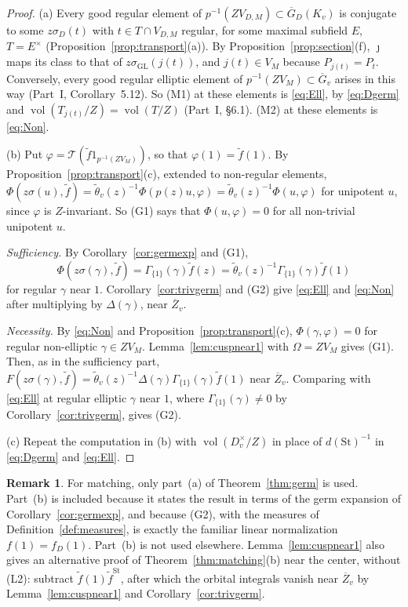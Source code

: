 \documentclass[12pt]{article}
\newcommand{\ov}[1]{\overline{#1}}
\newcommand{\vol}{\operatorname{vol}}
\newcommand{\GL}{\mathrm{GL}}
\newcommand{\St}{\mathrm{St}}
\newcommand{\Gb}{\ov{G}}
\newcommand{\Zb}{\ov{Z}}
\newcommand{\GDb}{\ov{G}_D}
\newcommand{\jj}{\jmath}
\newcommand{\sg}{\sigma}
\theoremstyle{plain}
\theoremstyle{definition}
\newtheorem{remark}[theorem]{Remark}
\begin{document}
\begin{proof}
(a) Every good regular element of $p^{-1}(ZV_{D,M})\subset\GDb(K_v)$ is conjugate to some $z\sg_D(t)$ with $t\in T\cap V_{D,M}$ regular, for some maximal subfield $E$, $T=E^\times$ (Proposition~\ref{prop:transport}(a)). By Proposition~\ref{prop:section}(f), $\jj$ maps its class to that of $z\sg_{\GL}(j(t))$, and $j(t)\in V_M$ because $P_{j(t)}=P_t$. Conversely, every good regular elliptic element of $p^{-1}(ZV_M)\subset\Gb_v$ arises in this way (Part~I, Corollary~5.12). So (M1) at these elements is \eqref{eq:Ell}, by \eqref{eq:Dgerm} and $\vol(T_{j(t)}/Z)=\vol(T/Z)$ (Part~I, \S6.1). (M2) at these elements is \eqref{eq:Non}.

(b) Put $\varphi=\mathcal T(\tilde f1_{p^{-1}(ZV_M)})$, so that $\varphi(1)=\tilde f(1)$. By Proposition~\ref{prop:transport}(c), extended to non-regular elements, $\Phi(z\sg(u),\tilde f)=\tilde\theta_v(z)^{-1}\Phi(p(z)u,\varphi)=\tilde\theta_v(z)^{-1}\Phi(u,\varphi)$ for unipotent $u$, since $\varphi$ is $Z$-invariant. So (G1) says that $\Phi(u,\varphi)=0$ for all non-trivial unipotent $u$.

\emph{Sufficiency.} By Corollary~\ref{cor:germexp} and (G1), \[ \Phi(z\sg(\gamma),\tilde f)=\Gamma_{\{1\}}(\gamma)\tilde f(z)=\tilde\theta_v(z)^{-1}\Gamma_{\{1\}}(\gamma)\tilde f(1) \]
for regular $\gamma$ near $1$. Corollary~\ref{cor:trivgerm} and (G2) give \eqref{eq:Ell} and \eqref{eq:Non} after multiplying by $\Delta(\gamma)$, near $\Zb_v$.

\emph{Necessity.} By \eqref{eq:Non} and Proposition~\ref{prop:transport}(c), $\Phi(\gamma,\varphi)=0$ for regular non-elliptic $\gamma\in ZV_M$. Lemma~\ref{lem:cuspnear1} with $\Omega=ZV_M$ gives (G1). Then, as in the sufficiency part, $F(z\sg(\gamma),\tilde f)=\tilde\theta_v(z)^{-1}\Delta(\gamma)\Gamma_{\{1\}}(\gamma)\tilde f(1)$ near $\Zb_v$. Comparing with \eqref{eq:Ell} at regular elliptic $\gamma$ near $1$, where $\Gamma_{\{1\}}(\gamma)\ne0$ by Corollary~\ref{cor:trivgerm}, gives (G2).

(c) Repeat the computation in (b) with $\vol(D_v^\times/Z)$ in place of $d(\St)^{-1}$ in \eqref{eq:Dgerm} and \eqref{eq:Ell}.
\end{proof}

\begin{remark}
For matching, only part~(a) of Theorem~\ref{thm:germ} is used. Part~(b) is included because it states the result in terms of the germ expansion of Corollary~\ref{cor:germexp}, and because (G2), with the measures of Definition~\ref{def:measures}, is exactly the familiar linear normalization $f(1)=f_D(1)$. Part~(b) is not used elsewhere. Lemma~\ref{lem:cuspnear1} also gives an alternative proof of Theorem~\ref{thm:matching}(b) near the center, without (L2): subtract $\tilde f(1)\tilde f^{\St}$, after which the orbital integrals vanish near $\Zb_v$ by Lemma~\ref{lem:cuspnear1} and Corollary~\ref{cor:trivgerm}.
\end{remark}
\end{document}
